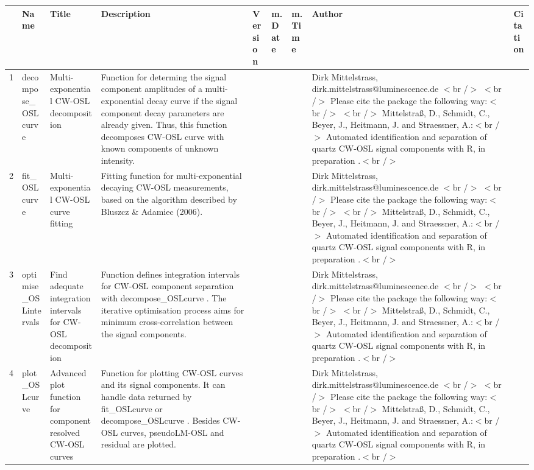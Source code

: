 \begin{table}[ht]
\centering
\begin{tabular}{rllllllll}
  \hline
 & Name & Title & Description & Version & m.Date & m.Time & Author & Citation \\ 
  \hline
1 & decompose\_OSLcurve & Multi-exponential CW-OSL decomposition & Function for determing the signal component amplitudes of a multi-exponential decay curve if the signal component decay parameters are already given. Thus, this function decomposes CW-OSL curve with known components of unknown intensity. &  &  &  & Dirk Mittelstrass,  dirk.mittelstrass@luminescence.de $<$br /$>$ $<$br /$>$ Please cite the package the following way:$<$br /$>$ $<$br /$>$ Mittelstraß, D., Schmidt, C., Beyer, J., Heitmann, J. and Straessner, A.:$<$br /$>$ Automated identification and separation of quartz CW-OSL signal components with R,  in preparation .$<$br /$>$ &  \\ 
  2 & fit\_OSLcurve & Multi-exponential CW-OSL curve fitting & Fitting function for multi-exponential decaying CW-OSL measurements, based on the algorithm described by Bluszcz \& Adamiec (2006). &  &  &  & Dirk Mittelstrass,  dirk.mittelstrass@luminescence.de $<$br /$>$ $<$br /$>$ Please cite the package the following way:$<$br /$>$ $<$br /$>$ Mittelstraß, D., Schmidt, C., Beyer, J., Heitmann, J. and Straessner, A.:$<$br /$>$ Automated identification and separation of quartz CW-OSL signal components with R,  in preparation .$<$br /$>$ &  \\ 
  3 & optimise\_OSLintervals & Find adequate integration intervals for CW-OSL decomposition & Function defines integration intervals for CW-OSL component separation with  decompose\_OSLcurve . The iterative optimisation process aims for minimum cross-correlation between the signal components. &  &  &  & Dirk Mittelstrass,  dirk.mittelstrass@luminescence.de $<$br /$>$ $<$br /$>$ Please cite the package the following way:$<$br /$>$ $<$br /$>$ Mittelstraß, D., Schmidt, C., Beyer, J., Heitmann, J. and Straessner, A.:$<$br /$>$ Automated identification and separation of quartz CW-OSL signal components with R,  in preparation .$<$br /$>$ &  \\ 
  4 & plot\_OSLcurve & Advanced plot function for component resolved CW-OSL curves & Function for plotting CW-OSL curves and its signal components. It can handle data returned by  fit\_OSLcurve  or  decompose\_OSLcurve . Besides CW-OSL curves, pseudoLM-OSL and residual are plotted. &  &  &  & Dirk Mittelstrass,  dirk.mittelstrass@luminescence.de $<$br /$>$ $<$br /$>$ Please cite the package the following way:$<$br /$>$ $<$br /$>$ Mittelstraß, D., Schmidt, C., Beyer, J., Heitmann, J. and Straessner, A.:$<$br /$>$ Automated identification and separation of quartz CW-OSL signal components with R,  in preparation .$<$br /$>$ &  \\ 

\end{tabular}
\end{table}
